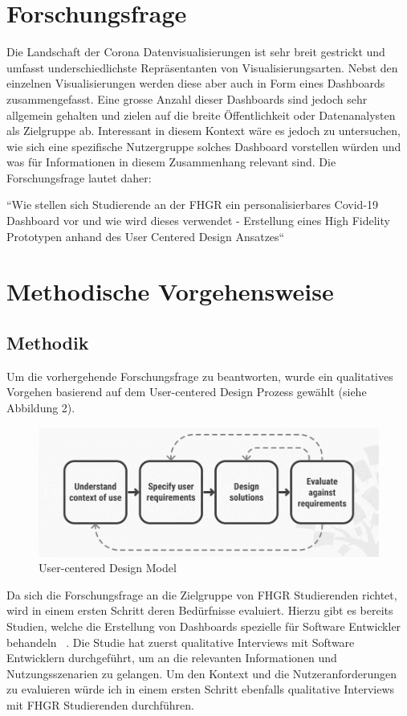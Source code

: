 \documentclass[12pt, oneside]{article}
\begin{document}
\clearpage
\section{Forschungsfrage}
Die Landschaft der Corona Datenvisualisierungen ist sehr breit gestrickt und umfasst underschiedlichste Repräsentanten von Visualisierungsarten. Nebst den einzelnen Visualisierungen werden diese aber auch in Form eines Dashboards zusammengefasst. Eine grosse Anzahl dieser Dashboards sind jedoch sehr allgemein gehalten und zielen auf die breite Öffentlichkeit oder Datenanalysten als Zielgruppe ab. Interessant in diesem Kontext wäre es jedoch zu untersuchen, wie sich eine spezifische Nutzergruppe solches Dashboard vorstellen würden und was für Informationen in diesem Zusammenhang relevant sind. Die Forschungsfrage lautet daher:

``Wie stellen sich Studierende an der FHGR ein personalisierbares Covid-19 Dashboard vor und wie wird dieses verwendet - Erstellung eines High Fidelity Prototypen anhand des User Centered Design Ansatzes``

\clearpage
\section{Methodische Vorgehensweise}
\subsection{Methodik}
Um die vorhergehende Forschungsfrage zu beantworten, wurde ein qualitatives Vorgehen basierend auf dem User-centered Design Prozess gewählt (siehe Abbildung 2).

\begin{figure}[ht]
	\includegraphics[width=12cm]{user-centered-design-molde.png}
	\centering
	\caption{User-centered Design Model ~\citep{public_media_user_centered_design}}
\end{figure}


Da sich die Forschungsfrage an die Zielgruppe von FHGR Studierenden richtet, wird in einem ersten Schritt deren Bedürfnisse evaluiert. Hierzu gibt es bereits Studien, welche die Erstellung von Dashboards spezielle für Software Entwickler behandeln ~\citep{design_and_validation_of_precooked_developer_dashboard}. Die Studie hat zuerst qualitative Interviews mit Software Entwicklern durchgeführt, um an die relevanten Informationen und Nutzungsszenarien zu gelangen. Um den Kontext und die Nutzeranforderungen zu evaluieren würde ich in einem ersten Schritt ebenfalls qualitative Interviews mit FHGR Studierenden durchführen.
\end{document}
